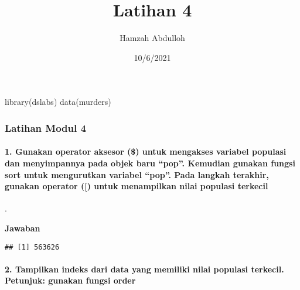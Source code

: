 \documentclass[
]{article}
\title{Latihan 4}
\author{Hamzah Abdulloh}
\date{10/6/2021}
\newenvironment{Shaded}{\begin{snugshade}}{\end{snugshade}}
\newcommand{\DecValTok}[1]{\textcolor[rgb]{0.00,0.00,0.81}{#1}}
\newcommand{\FunctionTok}[1]{\textcolor[rgb]{0.00,0.00,0.00}{#1}}
\newcommand{\NormalTok}[1]{#1}
\newcommand{\OtherTok}[1]{\textcolor[rgb]{0.56,0.35,0.01}{#1}}
\newcommand{\SpecialCharTok}[1]{\textcolor[rgb]{0.00,0.00,0.00}{#1}}
\begin{document}
\maketitle

\begin{Shaded}
\begin{Highlighting}[]
\FunctionTok{library}\NormalTok{(dslabs)}
\FunctionTok{data}\NormalTok{(murders) }
\end{Highlighting}
\end{Shaded}

\hypertarget{latihan-modul-4}{%
\subsubsection{Latihan Modul 4}\label{latihan-modul-4}}

\hypertarget{gunakan-operator-aksesor-untuk-mengakses-variabel-populasi-dan-menyimpannya-pada-objek-baru-pop.-kemudian-gunakan-fungsi-sort-untuk-mengurutkan-variabel-pop.-pada-langkah-terakhir-gunakan-operator-untuk-menampilkan-nilai-populasi-terkecil}{%
\paragraph{1. Gunakan operator aksesor (\$) untuk mengakses variabel
populasi dan menyimpannya pada objek baru ``pop''. Kemudian gunakan
fungsi sort untuk mengurutkan variabel ``pop''. Pada langkah terakhir,
gunakan operator ({[}) untuk menampilkan nilai populasi
terkecil}\label{gunakan-operator-aksesor-untuk-mengakses-variabel-populasi-dan-menyimpannya-pada-objek-baru-pop.-kemudian-gunakan-fungsi-sort-untuk-mengurutkan-variabel-pop.-pada-langkah-terakhir-gunakan-operator-untuk-menampilkan-nilai-populasi-terkecil}}

.

\textbf{Jawaban}

\begin{Shaded}
\end{Shaded}

\begin{verbatim}
## [1] 563626
\end{verbatim}

\hypertarget{tampilkan-indeks-dari-data-yang-memiliki-nilai-populasi-terkecil.-petunjuk-gunakan-fungsi-order}{%
\paragraph{2. Tampilkan indeks dari data yang memiliki nilai populasi
terkecil. Petunjuk: gunakan fungsi
order}\label{tampilkan-indeks-dari-data-yang-memiliki-nilai-populasi-terkecil.-petunjuk-gunakan-fungsi-order}}
\end{document}
